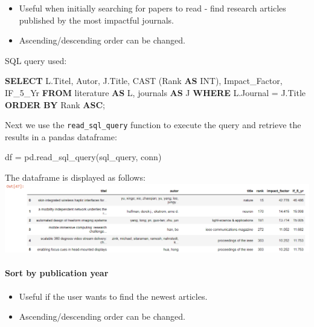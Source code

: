 \documentclass[11pt]{article}
\makeatletter
\def\maxwidth{\ifdim\Gin@nat@width>\linewidth\linewidth
    \else\Gin@nat@width\fi}
\let\Oldincludegraphics\includegraphics
\renewcommand{\includegraphics}[1]{\Oldincludegraphics[width=.8\maxwidth]{#1}}
\providecommand{\tightlist}{%
      \setlength{\itemsep}{0pt}\setlength{\parskip}{0pt}}
\newenvironment{Shaded}{}{}
\newcommand{\KeywordTok}[1]{\textcolor[rgb]{0.00,0.44,0.13}{\textbf{{#1}}}}
\newcommand{\DataTypeTok}[1]{\textcolor[rgb]{0.56,0.13,0.00}{{#1}}}
\newcommand{\FunctionTok}[1]{\textcolor[rgb]{0.02,0.16,0.49}{{#1}}}
\newcommand{\NormalTok}[1]{{#1}}
\newcommand{\OperatorTok}[1]{\textcolor[rgb]{0.40,0.40,0.40}{{#1}}}
\makeatother
\begin{document}
\begin{itemize}
\tightlist
\item
  Useful when initially searching for papers to read - find research
  articles published by the most impactful journals.
\item
  Ascending/descending order can be changed.
\end{itemize}

SQL query used:

\begin{Shaded}
\begin{Highlighting}[]
\KeywordTok{SELECT}\NormalTok{ L.Titel, Autor, J.Title, }\FunctionTok{CAST}\NormalTok{ (}\FunctionTok{Rank} \KeywordTok{AS} \DataTypeTok{INT}\NormalTok{), Impact_Factor, IF_5_Yr}
\KeywordTok{FROM}\NormalTok{ literature }\KeywordTok{AS}\NormalTok{ L, journals }\KeywordTok{AS}\NormalTok{ J}
\KeywordTok{WHERE}\NormalTok{ L.Journal = J.Title}
\KeywordTok{ORDER} \KeywordTok{BY} \FunctionTok{Rank} \KeywordTok{ASC}\NormalTok{;}
\end{Highlighting}
\end{Shaded}

Next we use the \texttt{read\_sql\_query} function to execute the query
and retrieve the results in a pandas dataframe:

\begin{Shaded}
\begin{Highlighting}[]
\NormalTok{df }\OperatorTok{=}\NormalTok{ pd.read_sql_query(sql_query, conn)}
\end{Highlighting}
\end{Shaded}

The dataframe is displayed as follows:\\
\includegraphics{images/sortrank_df.png}

\paragraph{Sort by publication year}\label{sort-by-publication-year}

\begin{itemize}
\tightlist
\item
  Useful if the user wants to find the newest articles.
\item
  Ascending/descending order can be changed.
\end{itemize}
\end{document}
